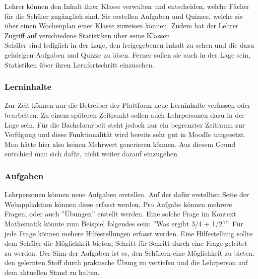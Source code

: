 Lehrer können den Inhalt ihrer Klasse verwalten und entscheiden, welche Fächer für die Schüler zugänglich sind. Sie erstellen Aufgaben und Quizzes, welche sie über einen Wochenplan einer Klasse zuweisen können. Zudem hat der Lehrer Zugriff auf verschiedene Statistiken über seine Klassen. \\

Schüler sind lediglich in der Lage, den freigegebenen Inhalt zu sehen und die dazu gehörigen Aufgaben und Quizze zu lösen. Ferner sollen sie auch in der Lage sein, Statistiken über ihren Lernfortschritt einzusehen.

\subsubsection*{Lerninhalte}
Zur Zeit können nur die Betreiber der Plattform neue Lerninhalte verfassen oder bearbeiten. Zu einem späteren Zeitpunkt sollen auch Lehrpersonen dazu in der Lage sein. Für die Bachelorarbeit steht jedoch nur ein begrenzter Zeitraum zur Verfügung und diese Funktionalität wird bereits sehr gut in Moodle umgesetzt. Man hätte hier also keinen Mehrwert generieren können. Aus diesem Grund entschied man sich dafür, nicht weiter darauf einzugehen. 

\subsubsection*{Aufgaben}
Lehrpersonen können neue Aufgaben erstellen. Auf der dafür erstellten Seite der Webappliaktion können diese erfasst werden. Pro Aufgabe können mehrere Fragen, oder auch ''Übungen'' erstellt werden. Eine solche Frage im Kontext Mathematik könnte zum Beispiel folgendes sein: ''Was ergibt 3/4 + 1/2?''. Für jede Frage können mehere Hilfestellungen erfasst werden. Eine Hilfestellung sollte dem Schüler die Möglichkeit bieten, Schritt für Schritt durch eine Frage geleitet zu werden. Der Sinn der Aufgaben ist es, den Schülern eine Möglichkeit zu bieten, den gelernten Stoff durch praktische Übung zu vertiefen und die Lehrperson auf dem aktuellen Stand zu halten.




\newpage